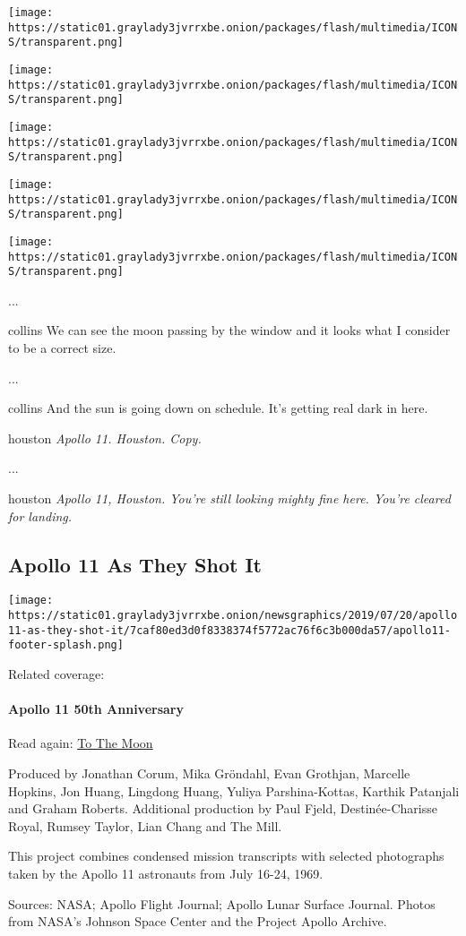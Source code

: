 \texttt{[image: https://static01.graylady3jvrrxbe.onion/packages/flash/multimedia/ICONS/transparent.png]}

\texttt{[image: https://static01.graylady3jvrrxbe.onion/packages/flash/multimedia/ICONS/transparent.png]}

\texttt{[image: https://static01.graylady3jvrrxbe.onion/packages/flash/multimedia/ICONS/transparent.png]}

\texttt{[image: https://static01.graylady3jvrrxbe.onion/packages/flash/multimedia/ICONS/transparent.png]}

\texttt{[image: https://static01.graylady3jvrrxbe.onion/packages/flash/multimedia/ICONS/transparent.png]}

...

collins We can see the moon passing by the window and it looks what I
consider to be a correct size.

...

collins And the sun is going down on schedule. It's getting real dark in
here.

houston \emph{Apollo 11. Houston. Copy.}

...

houston \emph{Apollo 11, Houston. You're still looking mighty fine here.
You're cleared for landing.}

\hypertarget{apollo-11-as-they-shot-it-1}{%
\subsection{\texorpdfstring{\textbf{Apollo 11} As They Shot
It}{Apollo 11 As They Shot It}}\label{apollo-11-as-they-shot-it-1}}

\href{https://www.nytimes3xbfgragh.onion/spotlight/apollo-11-moon-landing}{}

\texttt{[image: https://static01.graylady3jvrrxbe.onion/newsgraphics/2019/07/20/apollo11-as-they-shot-it/7caf80ed3d0f8338374f5772ac76f6c3b000da57/apollo11-footer-splash.png]}

Related coverage:

\hypertarget{apollo-11-50th-anniversary}{%
\paragraph{Apollo 11 50th
Anniversary}\label{apollo-11-50th-anniversary}}

Read again:
\href{https://www.nytimes3xbfgragh.onion/interactive/2019/07/18/science/apollo-11-as-they-shot-it-ul.html}{To
The Moon}

Produced by Jonathan Corum, Mika Gröndahl, Evan Grothjan, Marcelle
Hopkins, Jon Huang, Lingdong Huang, Yuliya Parshina-Kottas, Karthik
Patanjali and Graham Roberts. Additional production by Paul Fjeld,
Destinée-Charisse Royal, Rumsey Taylor, Lian Chang and The Mill.

This project combines condensed mission transcripts with selected
photographs taken by the Apollo 11 astronauts from July 16-24, 1969.

Sources: NASA; Apollo Flight Journal; Apollo Lunar Surface Journal.
Photos from NASA's Johnson Space Center and the Project Apollo Archive.
